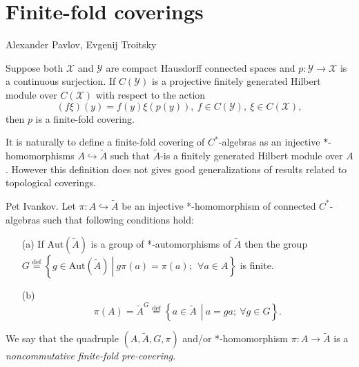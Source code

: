 \documentclass{beamer}
\theoremstyle{plain}
\newcommand{\be}{\begin{equation}}
\newcommand{\ee}{\end{equation}}
\newcommand{\Aut}{\mathrm{Aut}}
\newcommand{\bydef}{\stackrel{\mathrm{def}}{=}}
\newcommand{\hookto}{\hookrightarrow}        %
\begin{document}
\section{Finite-fold coverings}
 \begin{frame}
 	
 	\alert{Alexander Pavlov, Evgenij Troitsky}
 \begin{theorem}
 	Suppose both $\mathcal X$ and $\mathcal Y$ are compact Hausdorff connected spaces and $p :\mathcal  Y \to \mathcal X$
 	is a continuous surjection. If $C(\mathcal Y )$ is a projective finitely generated Hilbert module over
 	$C(\mathcal X)$ with respect to the action
 	\begin{equation*}
 		(f\xi)(y) = f(y)\xi(p(y)), ~ f \in  C(\mathcal Y ), ~ \xi \in  C(\mathcal X),
 	\end{equation*}
 	then $p$ is a finite-fold  covering.
 \end{theorem}
  It is naturally to define a finite-fold covering of $C^*$-algebras as an injective $*$-homomorphisms $A\hookto \widetilde A$ such that $ \widetilde A$-is a finitely generated Hilbert module over
  $A$. However this definition does not gives good generalizations of results  related to topological coverings.
 
 \end{frame}
\begin{frame}
	   \begin{definition}\label{pre_defn} \alert{Pet Ivankov}.
	Let $\pi: A \hookto \widetilde{A}$ be an injective *-homomorphism of connected  $C^*$-algebras such that following conditions hold:
	\begin{enumerate}
		\item[(a)] If $\Aut\left(\widetilde{A} \right)$ is a group of *-automorphisms of $\widetilde{A}$ then the group  
		$
		G \bydef \left\{ \left.g \in \Aut\left(\widetilde{A} \right)~\right|~ g\pi\left( a\right)  = \pi\left( a\right) ;~~\forall a \in A\right\}
		$
		is finite.
		\item[(b)] 	\be\label{cond_b_eqn}
	\pi\left( 	A\right)  = \widetilde{A}^G\stackrel{\text{def}}{=}\left\{\left.a\in \widetilde{A}~~\right|~ a = g a;~ \forall g \in G\right\}.\ee
	\end{enumerate}
	We say that the quadruple $\left(A, \widetilde{A}, G, \pi \right)$ and/or *-homomorphism $\pi: A \to \widetilde{A}$   is a \textit{noncommutative finite-fold  pre-covering}. 
\end{definition}

\end{frame}
\end{document}
